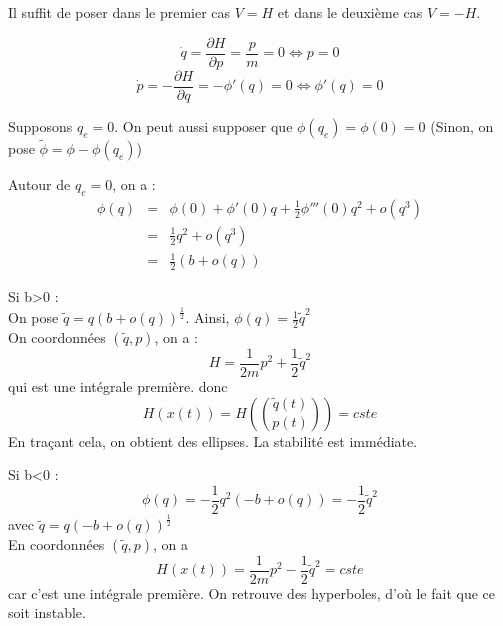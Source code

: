\begin{dem}
	Il suffit de poser dans le premier cas $V=H$ et dans le deuxième cas $V=-H$. 
\end{dem}


\begin{dem}
	\[\dot{q}=\frac{\partial H}{\partial p} = \frac{p}{m} =0 \Leftrightarrow p=0\]
	\[\dot{p}=-\frac{\partial H}{\partial q}=-\phi'(q)=0 \Leftrightarrow \phi'(q)=0\]

	Supposons $q_e=0$. On peut aussi supposer que $\phi(q_e)=\phi(0)=0$ (Sinon, on pose $\tilde{\phi}=\phi-\phi(q_e)$)
	
	\bigskip
	Autour de $q_e=0$, on a :
	\begin{eqnarray*}
		\phi(q)&=&\phi(0)+\phi'(0)q+\frac{1}{2}\phi'''(0)q^2+o(q^3)\\
		       &=& \frac{1}{2}q^2+o(q^3)\\
		       &=& \frac{1}{2}(b+o(q))
	\end{eqnarray*}

	Si b>0 :\\
	On pose $\tilde{q}=q(b+o(q))^{\frac{1}{2}}$. Ainsi, $\phi(q)=\frac{1}{2}\tilde{q}^2$\\
	On coordonnées $(\tilde{q},p)$, on a :
	\[H=\frac{1}{2m}p^2 + \frac{1}{2}\tilde{q}^2\]
	qui est une intégrale première. donc \[H(x(t))=H\left(\binom{\tilde{q}(t)}{p(t)} \right)=cste\]
	En traçant cela, on obtient des ellipses. La stabilité est immédiate.

	Si b<0 :\\
	\[\phi(q)=-\frac{1}{2}q^2(-b+o(q))=-\frac{1}{2}\tilde{q}^2\]
	avec $\tilde{q}=q(-b+o(q))^{\frac{1}{2}}$\\

	En coordonnées $(\tilde{q}, p)$, on a 
	\[H(x(t))=\frac{1}{2m}p^2-\frac{1}{2}\tilde{q}^2=cste\] 
	car c'est une intégrale première. On retrouve des hyperboles, d'où le fait que ce soit instable.
\end{dem}

